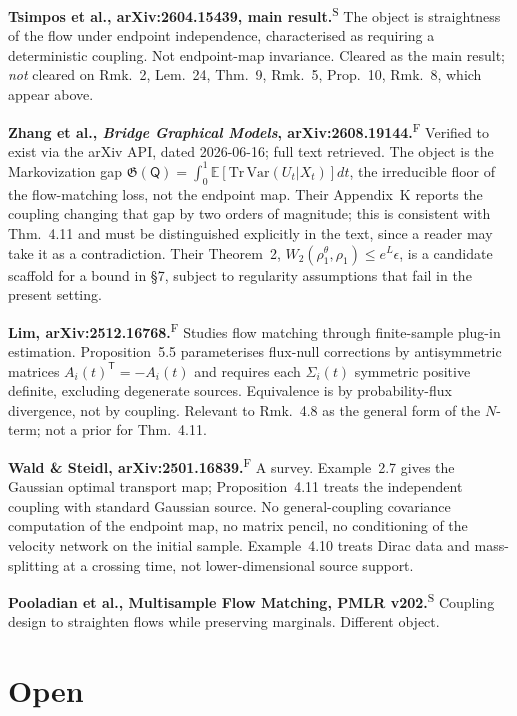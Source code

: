\documentclass[11pt]{article}
\newcommand{\F}{\textsuperscript{F}}
\newcommand{\Sec}{\textsuperscript{S}}
\newcommand{\T}{\mathsf{T}}
\begin{document}
\textbf{Tsimpos et al., arXiv:2604.15439, main result.}\Sec{} The object is straightness of the
flow under endpoint independence, characterised as requiring a deterministic coupling. Not
endpoint-map invariance. Cleared as the main result; \emph{not} cleared on Rmk.~2, Lem.~24,
Thm.~9, Rmk.~5, Prop.~10, Rmk.~8, which appear above.

\textbf{Zhang et al., \emph{Bridge Graphical Models}, arXiv:2608.19144.}\F{} Verified to exist via
the arXiv API, dated 2026-06-16; full text retrieved. The object is the Markovization gap
$\mathfrak G(\mathsf Q)=\int_0^1\mathbb E[\mathrm{Tr}\,\mathrm{Var}(U_t|X_t)]dt$, the irreducible
floor of the flow-matching loss, not the endpoint map. Their Appendix~K reports the coupling
changing that gap by two orders of magnitude; this is consistent with Thm.~4.11 and must be
distinguished explicitly in the text, since a reader may take it as a contradiction. Their
Theorem~2, $W_2(\rho_1^\theta,\rho_1)\le e^L\epsilon$, is a candidate scaffold for a bound in
\S7, subject to regularity assumptions that fail in the present setting.

\textbf{Lim, arXiv:2512.16768.}\F{} Studies flow matching through finite-sample plug-in
estimation. Proposition~5.5 parameterises flux-null corrections by antisymmetric matrices
$A_i(t)^{\T}=-A_i(t)$ and requires each $\Sigma_i(t)$ symmetric positive definite, excluding
degenerate sources. Equivalence is by probability-flux divergence, not by coupling. Relevant to
Rmk.~4.8 as the general form of the $N$-term; not a prior for Thm.~4.11.

\textbf{Wald \& Steidl, arXiv:2501.16839.}\F{} A survey. Example~2.7 gives the Gaussian optimal
transport map; Proposition~4.11 treats the independent coupling with standard Gaussian source. No
general-coupling covariance computation of the endpoint map, no matrix pencil, no conditioning of
the velocity network on the initial sample. Example~4.10 treats Dirac data and mass-splitting at a
crossing time, not lower-dimensional source support.

\textbf{Pooladian et al., Multisample Flow Matching, PMLR v202.}\Sec{} Coupling design to
straighten flows while preserving marginals. Different object.

\section{Open}
\end{document}
